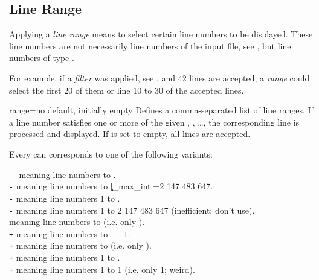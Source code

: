 \documentclass[a4paper,11pt]{ltxdoc}
\begin{document}

\clearpage
\subsection{Line Range}\label{subsec:linerange}

Applying a \emph{line range} means to select certain line numbers to be
displayed. These line numbers are not necessarily line numbers of
the input file, see , but line numbers of
type .

For example, if a \emph{filter} was applied, see ,
and 42 lines are accepted, a \emph{range} could select the first 20 of them or
line 10 to 30 of the accepted lines.


\begin{docCsvKey}[][doc new and updated={2021-06-29}{2022-09-21}]{range}{=}{no default, initially empty}
  Defines a comma-separated list of line ranges. If a line number 
  satisfies one or more of the given , , \ldots,
  the corresponding line is processed and displayed.
  If  is set to empty, all lines are accepted.

  Every  can
  corresponds to one of the following variants:
  \begin{tabbing}
  \hspace*{2cm}\=\kill
  \texttt{-} \> meaning line numbers  to .\\
  \texttt{-}         \> meaning line numbers  to |\c_max_int|=2 147 483 647.\\
  \texttt{-}         \> meaning line numbers 1 to .\\
  \texttt{-}                 \> meaning line numbers 1 to 2 147 483 647 (inefficient; don't use).\\
  \texttt{}          \> meaning line numbers  to  (i.e. only ).\\
  \texttt{+} \> meaning line numbers  to $+$$-1$.\\
  \texttt{+}         \> meaning line numbers  to  (i.e. only ).\\
  \texttt{+}         \> meaning line numbers 1 to .\\
  \texttt{+}                 \> meaning line numbers 1 to 1 (i.e. only 1; weird).\\
  \end{tabbing}


\end{docCsvKey}
\end{document}
